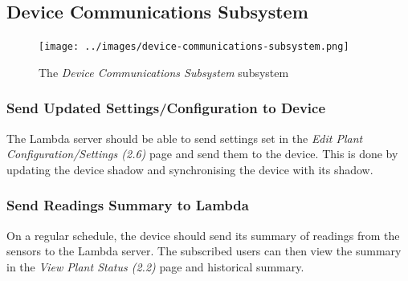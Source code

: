\documentclass{article}
\begin{document}
	\subsection{Device Communications Subsystem}
		\begin{figure}[H]
			\centering
			\texttt{[image: ../images/device-communications-subsystem.png]}
			\caption{The \emph{Device Communications Subsystem} subsystem}
		\end{figure}
		\subsubsection{Send Updated Settings/Configuration to Device}
			The Lambda server should be able to send settings set in the \emph{Edit Plant Configuration/Settings (2.6)} page and send them to the device. This is done by updating the device shadow and synchronising the device with its shadow.
		\subsubsection{Send Readings Summary to Lambda}
			On a regular schedule, the device should send its summary of readings from the sensors to the Lambda server. The subscribed users can then view the summary in the \emph{View Plant Status (2.2)} page and historical summary.
\end{document}
